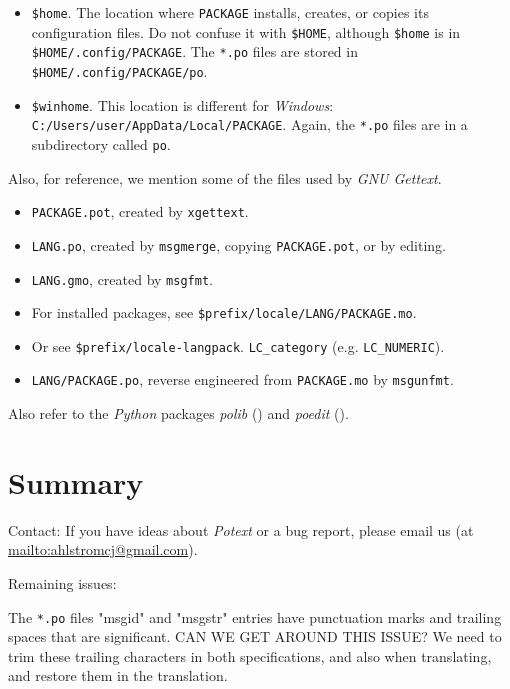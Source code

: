 \documentclass[
 11pt,
 twoside,
 a4paper,
 final                                 %
]{article}
\begin{document}
   \begin{itemize}
      \item \texttt{\$home}. The location where \texttt{PACKAGE} installs,
         creates, or copies its configuration files.
         Do not confuse it with \texttt{\$HOME},
         although \texttt{\$home} is in
         \texttt{\$HOME/.config/PACKAGE}.
         The \texttt{*.po} files are stored in
         \texttt{\$HOME/.config/PACKAGE/po}.
      \item \texttt{\$winhome}. This location is different for
         \textsl{Windows}:
         \texttt{C:/Users/user/AppData/Local/PACKAGE}.
         Again, the \texttt{*.po} files are in a
         subdirectory called \texttt{po}.
   \end{itemize}

   Also, for reference, we mention some of the files used by
   \textsl{GNU Gettext}.

   \begin{itemize}
      \item \texttt{PACKAGE.pot}, created by \texttt{xgettext}.
      \item \texttt{LANG.po}, created by \texttt{msgmerge},
         copying \texttt{PACKAGE.pot}, or by editing.
      \item \texttt{LANG.gmo}, created by \texttt{msgfmt}.
      \item For installed packages, see
         \texttt{\$prefix/locale/LANG/PACKAGE.mo}.
      \item Or see
         \texttt{\$prefix/locale-langpack}.
         \texttt{LC\_category} (e.g. \texttt{LC\_NUMERIC}).
      \item \texttt{LANG/PACKAGE.po}, reverse engineered from
         \texttt{PACKAGE.mo} by \texttt{msgunfmt}.
   \end{itemize}

   Also refer to the \textsl{Python} packages \textsl{polib} (\cite{polib})
   and \textsl{poedit} (\cite{poedit}).







\section{Summary}
\label{sec:summary}

   Contact: If you have ideas about \textsl{Potext} or a bug report,
   please email us (at \url{mailto:ahlstromcj@gmail.com}).

   Remaining issues:

   The \texttt{*.po} files "msgid" and "msgstr" entries have punctuation marks
   and trailing spaces that are significant.
   CAN WE GET AROUND THIS ISSUE?
   We need to trim these trailing characters in both specifications,
   and also when translating, and restore them in the translation.




\printindex
\end{document}
